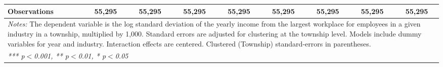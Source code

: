 \begin{tabular}{lcccccccc}
   Observations                                          & 55,295          & 55,295          & 55,295          & 55,295           & 55,295           & 55,295           & 55,295           & 55,295\\  
   \midrule \midrule
\multicolumn{9}{p{24cm}}{\emph{Notes:} The dependent variable is the log 
    standard deviation of the yearly income from the largest workplace for 
    employees in a given industry in a township, multiplied by 1,000. Standard 
    errors are adjusted for clustering at the township level. Models include 
    dummy variables for year and industry. Interaction effects are centered. 
    Clustered (Township) standard-errors in parentheses.}\\
\multicolumn{9}{l}{\emph{*** p$<$0.001, ** p$<$0.01, * p$<$0.05}} \\ 
\end{tabular}
\par\endgroup
